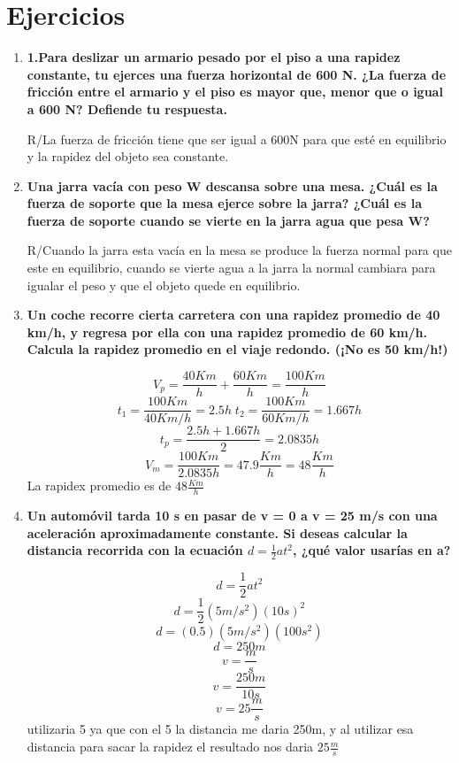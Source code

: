 \documentclass[a4paper]{article}
\begin{document}
		

	
	
	\section{Ejercicios}
	
	\begin{enumerate}
		\item\textbf{1.Para deslizar un armario pesado por el piso a una rapidez constante, tu ejerces una fuerza horizontal de 600 N. ¿La fuerza de fricción entre el armario y el piso es mayor que, menor que o igual a 600 N? Defiende tu respuesta.}
		
		R/La fuerza de fricción tiene que ser igual a 600N para que esté en equilibrio y la rapidez del objeto sea constante.
		
		\item\textbf{Una jarra vacía con peso W descansa sobre una mesa. ¿Cuál es la fuerza de soporte que la mesa 
			ejerce sobre la jarra? ¿Cuál es la fuerza de soporte cuando se vierte en la jarra agua que pesa W?}
		
		R/Cuando la jarra esta vacía en la mesa se produce la fuerza normal para que este en equilibrio, cuando se vierte agua a la jarra la normal cambiara para igualar el peso y que el objeto quede en equilibrio.
		\newpage
		\item\textbf{Un coche recorre cierta carretera con una rapidez promedio de 40 km/h, y regresa por ella con 
			una rapidez promedio de 60 km/h. Calcula la rapidez promedio en el viaje redondo. (¡No es 50 
			km/h!)}
		
		$$V_{p}=\frac{40Km}{h} + \frac{60Km}{h} = \frac{100Km}{h}$$ 
		$$t_{1}=\frac{100Km}{40Km/h} = 2.5h\; t_{2}= \frac{100Km}{60Km/h} = 1.667h$$ 
		$$t_{p}=\frac{2.5h +1.667h}{2}= 2.0835h$$ 
		$$V_{m}=\frac{100Km}{2.0835h}= 47.9\frac{Km}{h} = 48\frac{Km}{h}$$ 
		La rapidex promedio es de $48\frac{Km}{h}$
		
		\item\textbf{Un automóvil tarda 10 s en pasar de v = 0 a v = 25 m/s con una aceleración aproximadamente 
			constante. Si deseas calcular la distancia recorrida con la ecuación \textbf{$d=\frac{1}{2}at^2$}, ¿qué valor usarías 
			en a?} 
		
		$$d=\frac{1}{2}at^2$$
		$$d=\frac{1}{2}(5m/s^2)(10s)^2$$
		$$d=(0.5)(5m/s^2)(100s^2)$$
		$$d=250m$$
		$$v=\frac{m}{s}$$
		$$v=\frac{250m}{10s}$$
		$$v=25\frac{m}{s}$$
		utilizaria 5 ya que con el 5 la distancia me daria 250m, y al utilizar esa distancia para sacar la rapidez el resultado nos daria $25\frac{m}{s}$
		

\end{enumerate}
\end{document}
